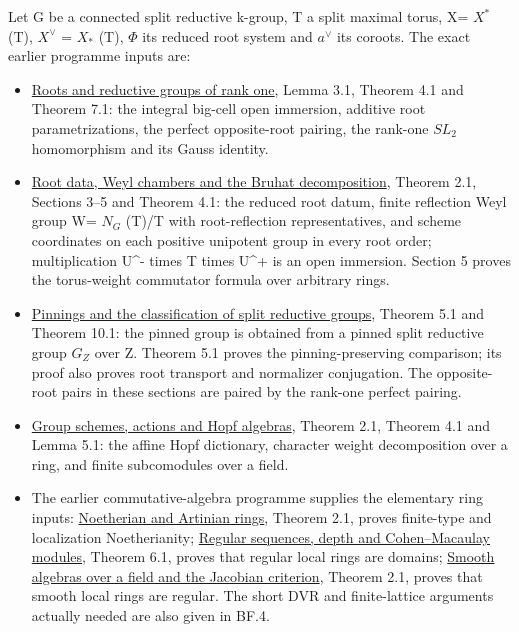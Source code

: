 \documentclass[
  11pt,
]{article}
\providecommand{\tightlist}{%
  \setlength{\itemsep}{0pt}\setlength{\parskip}{0pt}}
\begin{document}
Let G be a connected split reductive k-group, T a split maximal torus,
X= \(X^*\) (T), \(X^\vee\) = \(X_{*}\) (T), \(\Phi\) its reduced root
system and \(a^\vee\) its coroots. The exact earlier programme inputs
are:

\begin{itemize}
\tightlist
\item
  \href{../AG-RG/AG-RG-03.html}{Roots and reductive groups of rank one},
  Lemma 3.1, Theorem 4.1 and Theorem 7.1: the integral big-cell open
  immersion, additive root parametrizations, the perfect opposite-root
  pairing, the rank-one \(SL_{2}\) homomorphism and its Gauss identity.
\item
  \href{../AG-RG/AG-RG-04.html}{Root data, Weyl chambers and the Bruhat
  decomposition}, Theorem 2.1, Sections 3--5 and Theorem 4.1: the
  reduced root datum, finite reflection Weyl group W= \(N_{G}\) (T)/T
  with root-reflection representatives, and scheme coordinates on each
  positive unipotent group in every root order; multiplication U\^{}-
  times T times U\^{}+ is an open immersion. Section 5 proves the
  torus-weight commutator formula over arbitrary rings.
\item
  \href{../AG-RG/AG-RG-05.html}{Pinnings and the classification of split
  reductive groups}, Theorem 5.1 and Theorem 10.1: the pinned group is
  obtained from a pinned split reductive group \(G_{Z}\) over Z. Theorem
  5.1 proves the pinning-preserving comparison; its proof also proves
  root transport and normalizer conjugation. The opposite-root pairs in
  these sections are paired by the rank-one perfect pairing.
\item
  \href{../AG-GS/AG-GS-01.html}{Group schemes, actions and Hopf
  algebras}, Theorem 2.1, Theorem 4.1 and Lemma 5.1: the affine Hopf
  dictionary, character weight decomposition over a ring, and finite
  subcomodules over a field.
\item
  The earlier commutative-algebra programme supplies the elementary ring
  inputs: \href{../AG-CA/AG-CA-03.html}{Noetherian and Artinian rings},
  Theorem 2.1, proves finite-type and localization Noetherianity;
  \href{../AG-CA/AG-CA-12.html}{Regular sequences, depth and
  Cohen--Macaulay modules}, Theorem 6.1, proves that regular local rings
  are domains; \href{../AG-CA/AG-CA-18.html}{Smooth algebras over a
  field and the Jacobian criterion}, Theorem 2.1, proves that smooth
  local rings are regular. The short DVR and finite-lattice arguments
  actually needed are also given in BF.4.
\end{itemize}
\end{document}
